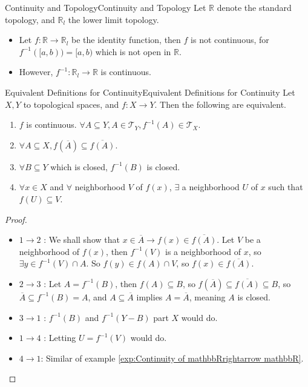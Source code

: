 \documentclass[../main.tex]{subfiles}
\begin{document}
\begin{example}{Continuity and Topology}{Continuity and Topology}
Let $\mathbb{R}$ denote the standard topology, and $\mathbb{R}_l$ the lower limit topology.
\begin{itemize}
\item Let $f: \mathbb{R}\rightarrow \mathbb{R}_l$ be the identity function, then $f$ is not continuous, for $f^{-1}([a,b)) = [a,b)$ which is not open in $\mathbb{R}$.
\item However, $f^{-1}: \mathbb{R}_l \rightarrow \mathbb{R}$ is continuous.
\end{itemize}
\end{example}

\begin{theorem}{Equivalent Definitions for Continuity}{Equivalent Definitions for Continuity}
Let $X,Y$ to topological spaces, and $f: X \rightarrow Y$. Then the following are equivalent.
\begin{enumerate}
\item $f$ is continuous. $\forall A \subseteq Y, A \in \mathcal{T}_Y, f^{-1}(A)\in \mathcal{T}_X$.
\item $\forall A \subseteq X, f(\overline{A}) \subseteq \overline{f(A)}$.
\item $\forall B \subseteq Y$ which is closed, $f^{-1}(B)$ is closed.
\item $\forall x\in X$ and $\forall $ neighborhood $V$ of $f(x)$, $\exists $ a neighborhood $U$ of $x$ such that $f(U) \subseteq V$.
\end{enumerate}
\end{theorem}
\begin{proof}
\begin{itemize}
\item $1 \rightarrow 2$ : We shall show that $x\in \overline{A} \rightarrow f(x)\in \overline{f(A)}$. Let $V$ be a neighborhood of $f(x)$, then $f^{-1}(V)$ is a neighborhood of $x$, so $\exists y\in f^{-1}(V)\cap A$. So $f(y)\in f(A)\cap V$, so $f(x) \in \overline{f(A)}$.
\item $2 \rightarrow 3$ : Let $A = f^{-1}(B)$, then $f(A) \subseteq B$, so $f(\overline{A}) \subseteq \overline{f(A)} \subseteq B$, so $\overline{A} \subseteq f^{-1}(B) = A$, and $A \subseteq \overline{A}$ implies $A = \overline{A}$, meaning $A$ is closed.
\item $3 \rightarrow 1$ : $f^{-1}(B)$ and $f^{-1}(Y-B)$ part $X$ would do.
\item $1 \rightarrow 4$ : Letting $U = f^{-1}(V)$ would do.
\item $4 \rightarrow 1$: Similar of example \ref{exp:Continuity of mathbbRrightarrow mathbbR}.
\end{itemize}
\end{proof}
\end{document}
